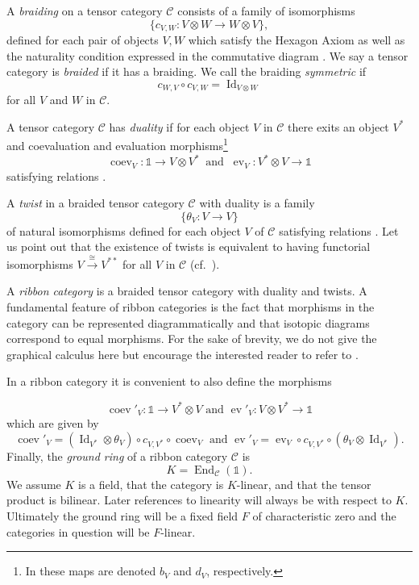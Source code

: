 \documentclass[12pt, reqno]{amsart}
\theoremstyle{definition}
\newcommand{\End}{\operatorname{End}}
\newcommand{\ev}{\operatorname{ev}}
\newcommand{\coev}{\operatorname{coev}}
\renewcommand{\1}{_{(1)}}
\renewcommand{\2}{_{(2)}}
\newcommand{\3}{_{(3)}}
\newcommand{\4}{_{(4)}}
\newcommand{\cat}{\mathcal{C}}
\newcommand{\unit}{\ensuremath{\mathds{1}}}
\newcommand{\Id}{\operatorname{Id}}
\begin{document}
A \emph{braiding} on a tensor category $\cat$ consists of a family of isomorphisms 
\[
\{c_{V,W}: V \otimes W \rightarrow W\otimes V \},
\]
 defined for each pair of objects $V,W$ which satisfy the Hexagon Axiom \cite[XIII.1 (1.3-1.4)]{Kas} as well as the naturality condition expressed in the commutative diagram \cite[(XIII.1.2)]{Kas}.
We say a tensor category is \emph{braided} if it has a braiding.  We call the braiding \emph{symmetric} if 
\[
c_{W, V} \circ c_{V,W} = \Id_{V \otimes W}
\]
for all $V$ and $W$ in $\cat$.

A tensor category $\cat$ has \emph{duality} if for each object $V$ in $\cat$ there exits an object $V^{*}$ and coevaluation and evaluation morphisms\footnote{In \cite{GKP} these maps are denoted $b_{V}$ and $d_{V}$, respectively.} 
$$\coev_{V}: \unit \rightarrow V\otimes V^{*} \: \text{ and } \: \ev_{V}: V^{*}\otimes V \rightarrow \unit$$
satisfying relations \cite[XIV.2 (2.1)]{Kas}.

A \emph{twist} in a braided tensor category $\cat$ with duality is a family 
\[
\{ \theta_{V}:V\rightarrow V \}
\]
of natural isomorphisms defined for each object $V$ of $\cat$ satisfying relations \cite[(XIV.3.1-3.2)]{Kas}. Let us point out that the existence of twists is equivalent to having functorial isomorphisms $V \xrightarrow{\cong} V^{**}$ for all $V$ in $\cat$ (cf.\ \cite[Section 2.2]{BK}).

A \emph{ribbon category} is a braided tensor category with duality and twists.  A fundamental feature of ribbon categories is the fact that morphisms in the category can be represented diagrammatically and that isotopic diagrams correspond to equal morphisms.  For the sake of brevity, we do not give the graphical calculus here but encourage the interested reader to refer to \cite{Kas}. 

In a ribbon category it is convenient to also define the morphisms

\begin{equation*}
\coev'_{V} : \unit \to V^{*} \otimes V \text{ and } \ev'_{V}: V \otimes V^{*} \to \unit
\end{equation*}
which are given by
\begin{equation*}
\coev'_V =(\Id_{V^*}\otimes \theta_V) \circ c_{V,V^*} \circ \coev_{V}  \text{ and } \ev'_V  = \ev_{V} \circ c_{V,V^*} \circ (\theta_V\otimes \Id_{V^*}).
\end{equation*}
Finally, the \emph{ground ring} of a ribbon category $\cat$ is 
\[
K=\End_{\cat}(\unit ).
\]  We assume $K$ is a field, that the category is $K$-linear, and that the tensor product is bilinear. Later references to linearity will always be with respect to $K$.
Ultimately the ground ring will be a fixed field $F$ of characteristic zero and the categories in question will be $F$-linear.
\end{document}
